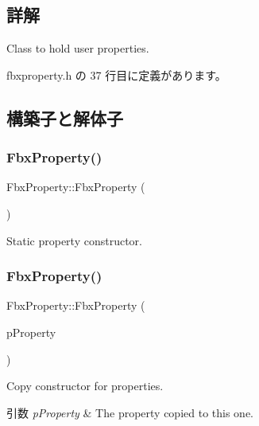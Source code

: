 \subsection{詳解}
Class to hold user properties. 

 fbxproperty.\+h の 37 行目に定義があります。



\subsection{構築子と解体子}
\mbox{\label{class_fbx_property_ac6f4561fd451ab81b93de09dd463e356}} 
\subsubsection{\texorpdfstring{Fbx\+Property()}{FbxProperty()}\hspace{0.1cm}{\footnotesize\ttfamily [1/5]}}
{\footnotesize\ttfamily Fbx\+Property\+::\+Fbx\+Property (\begin{DoxyParamCaption}{ }\end{DoxyParamCaption})}

Static property constructor. \mbox{\label{class_fbx_property_aaff1233681e54f5e8d70e695c2bdd2ca}} 
\subsubsection{\texorpdfstring{Fbx\+Property()}{FbxProperty()}\hspace{0.1cm}{\footnotesize\ttfamily [2/5]}}
{\footnotesize\ttfamily Fbx\+Property\+::\+Fbx\+Property (\begin{DoxyParamCaption}\item[{const \hyperlink{class_fbx_property}{Fbx\+Property} \&}]{p\+Property }\end{DoxyParamCaption})}

Copy constructor for properties. 
\begin{DoxyParams}{引数}
{\em p\+Property} & The property copied to this one. \\
\hline
\end{DoxyParams}
\mbox{\label{class_fbx_property_afaf9ebfe81538ea7948fde0d617f3408}} 

